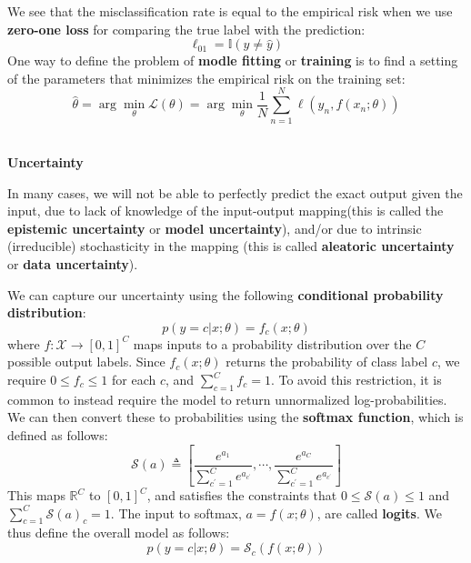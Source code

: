 We see that the misclassification rate is equal to the empirical risk when we use \textbf{zero-one loss} for comparing the true label with the prediction:
\begin{equation}
\ell_{01} = \mathbb{I}(y\neq \hat{y})
\end{equation}
One way to define the problem of \textbf{modle fitting} or \textbf{training} is to find a setting of the parameters that minimizes the empirical risk on the training set:
\begin{equation}
\hat{\theta} = \arg\min_{\theta}\mathcal{L}(\theta) = \arg\min_{\theta}\frac{1}{N}\sum_{n=1}^N\ell(y_n, f(x_n;\theta))
\end{equation}
~\\
\par
\noindent
\textbf{Uncertainty}
\par
In many cases, we will not be able to perfectly predict the exact output given the input, due to lack of knowledge of the input-output mapping(this is called the \textbf{epistemic uncertainty} or \textbf{model uncertainty}), and/or due to intrinsic (irreducible) stochasticity in the mapping (this is called \textbf{aleatoric uncertainty} or \textbf{data uncertainty}).
\par
We can capture our uncertainty using the following \textbf{conditional probability distribution}:
\begin{equation}
p(y=c|x;\theta) = f_c(x;\theta)
\end{equation}
where $f:\mathcal{X}\rightarrow[0,1]^C$ maps inputs to a probability distribution over the $C$ possible output labels. Since $f_c(x;\theta)$ returns the probability of class label $c$, we require $0\le f_c \le 1$ for each $c$, and $\sum_{c=1}^Cf_c=1$. To avoid this restriction, it is common to instead require the model to return unnormalized log-probabilities. We can then convert these to probabilities using the \textbf{softmax function}, which is defined as follows:
\begin{equation}
\mathcal{S}(a)  \triangleq [\frac{e^{a_1}}{\sum_{c^{\prime}=1}^Ce^{a_{c^{\prime}}}},\cdots,\frac{e^{a_C}}{\sum_{c^{\prime}=1}^Ce^{a_{c^{\prime}}}}]
\end{equation}
This maps $\mathbb{R}^C$ to $[0,1]^C$, and satisfies the constraints that $0\le \mathcal{S}(a) \le 1$ and $\sum_{c=1}^C\mathcal{S}(a)_c=1$. The input to softmax, $a=f(x;\theta)$, are called \textbf{logits}. We thus define the overall model as follows:
\begin{equation}
p(y=c|x;\theta) = \mathcal{S}_c(f(x;\theta))
\end{equation}
